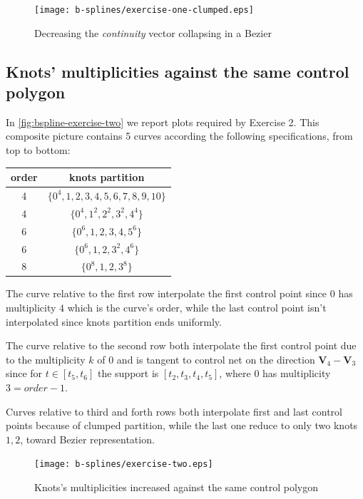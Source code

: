 \documentclass{article}
\begin{document}
\begin{figure}[h!]
  \centering
  \texttt{[image: b-splines/exercise-one-clumped.eps]}
  \caption{Decreasing the \emph{continuity} vector collapsing in a Bezier }
  \label{fig:bspline-exercise-one-clumped}
\end{figure}

\subsection{Knots' multiplicities against the same control polygon}
In \autoref{fig:bspline-exercise-two} we report plots required by Exercise 2.
This composite picture contains 5 curves according the following specifications,
from top to bottom:
\begin{center}
    \begin{tabular}{ c c }
        order & knots partition \\
        \hline
        4 & $\lbrace 0^{4},1,2,3,4,5,6,7,8,9,10 \rbrace$  \\
        4 & $\lbrace 0^{4},1^{2},2^{2},3^{2},4^{4} \rbrace$  \\
        6 & $\lbrace 0^{6},1,2,3,4,5^{6} \rbrace$  \\
        6 & $\lbrace 0^{6},1,2,3^{2},4^{6} \rbrace$  \\
        8 & $\lbrace 0^{8},1,2,3^{8} \rbrace$  \\
    \end{tabular}
\end{center}
The curve relative to the first row interpolate the first control point
since $0$ has multiplicity $4$ which is the curve's order, while the last
control point isn't interpolated since knots partition ends uniformly.

The curve relative to the second row both interpolate the first control
point due to the multiplicity $k$ of $0$ and is tangent to control net
on the direction $\mathbf{V}_{4} - \mathbf{V}_{3}$ since for $t \in [t_{5}, t_{6}]$
the support is $[t_{2},t_{3},t_{4},t_{5}]$, where $0$ has multiplicity $3 = order -1$.

Curves relative to third and forth rows both interpolate first and last control
points because of clumped partition, while the last one reduce to only two
knots $1,2$, toward Bezier representation.

\begin{figure}[h!]
  \centering
  \texttt{[image: b-splines/exercise-two.eps]}
  \caption{Knots's multiplicities increased against the same control polygon }
  \label{fig:bspline-exercise-two}
\end{figure}
\end{document}

